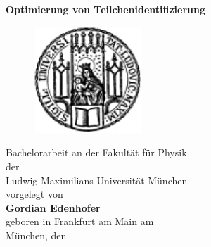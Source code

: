 \thispagestyle{empty}
\begin{center}

	\begin{LARGE}
		{
			\bf
			\hspace*{1cm} Optimierung von Teilchenidentifizierung \\ [0.3cm]
		}
	\end{LARGE}
	\vspace{0.5cm}
	\begin{figure}[htbp]
		\begin{center}
			\hspace*{1cm}
			\includegraphics[height=4cm]{pics/lmu3.pdf}
		\end{center}
	\end{figure}

	\vspace{1.0cm}
	\begin{large}
		\hspace*{1cm}Bachelorarbeit an der Fakultät für Physik \\
		\hspace*{1cm}der \\
		\hspace*{1cm}Ludwig-Maximilians-Universität München \\ [2.5cm]
		\hspace*{1cm}vorgelegt von \\
		{\bf
		\hspace*{1cm}Gordian Edenhofer \\ }
		\hspace*{1cm}geboren in Frankfurt am Main am \datengerman{} \\ [0.5cm]
		\hspace*{1cm}München, den \datengerman{}
	\end{large}
\end{center}

\setcounter{page}{0}
